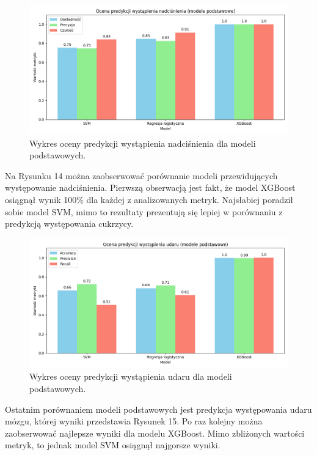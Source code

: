 \documentclass[onecolumn,12pt]{article}
\begin{document}
\begin{figure}[H]
    \centering
    \includegraphics[width=0.90\linewidth]{raport/graphs/nadcisnienie_przed.png}
    \captionsetup{justification=centering}
    \caption{Wykres oceny predykcji wystąpienia nadciśnienia dla modeli podstawowych.}
\end{figure}

\noindent
Na Rysunku 14 można zaobserwować porównanie modeli przewidujących występowanie nadciśnienia. Pierwszą obserwacją jest fakt, że model XGBoost osiągnął wynik 100\% dla każdej z analizowanych metryk. Najsłabiej poradził sobie model SVM, mimo to rezultaty prezentują się lepiej w porównaniu z predykcją występowania cukrzycy.

\begin{figure}[H]
    \centering
    \includegraphics[width=0.90\linewidth]{raport/graphs/udar_przed.png}
    \captionsetup{justification=centering}
    \caption{Wykres oceny predykcji wystąpienia udaru dla modeli podstawowych.}
\end{figure}

\noindent
Ostatnim porównaniem modeli podstawowych jest predykcja występowania udaru mózgu, której wyniki przedstawia Rysunek 15. Po raz kolejny można zaobserwować najlepsze wyniki dla modelu XGBoost. Mimo zbliżonych wartości metryk, to jednak model SVM osiągnął najgorsze wyniki.
\end{document}

